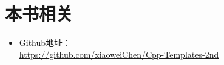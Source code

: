 \section{本书相关}
\begin{itemize}
  \item Github地址：\\\url{https://github.com/xiaoweiChen/Cpp-Templates-2nd}
\end{itemize}